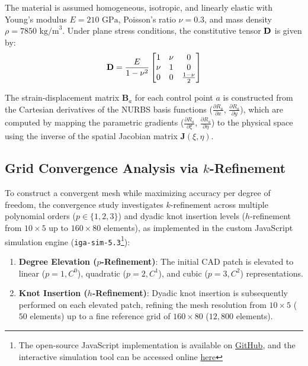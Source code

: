 The material is assumed homogeneous, isotropic, and linearly elastic with Young's modulus $E = 210\text{ GPa}$, Poisson's ratio $\nu = 0.3$, and mass density $\rho = 7850\text{ kg/m}^3$. Under plane stress conditions, the constitutive tensor $\mathbf{D}$ is given by:
\begin{equation}
    \mathbf{D} = \frac{E}{1 - \nu^2} \begin{bmatrix} 1 & \nu & 0 \\ \nu & 1 & 0 \\ 0 & 0 & \frac{1 - \nu}{2} \end{bmatrix}
\end{equation}

The strain-displacement matrix $\mathbf{B}_a$ for each control point $a$ is constructed from the Cartesian derivatives of the NURBS basis functions ($\frac{\partial R_a}{\partial x}$, $\frac{\partial R_a}{\partial y}$), which are computed by mapping the parametric gradients ($\frac{\partial R_a}{\partial \xi}$, $\frac{\partial R_a}{\partial \eta}$) to the physical space using the inverse of the spatial Jacobian matrix $\mathbf{J}(\xi, \eta)$.

\subsection{Grid Convergence Analysis via \texorpdfstring{$k$-Refinement}{k-Refinement}}
To construct a convergent mesh while maximizing accuracy per degree of freedom, the convergence study investigates $k$-refinement across multiple polynomial orders ($p \in \{1, 2, 3\}$) and dyadic knot insertion levels ($h$-refinement from $10 \times 5$ up to $160 \times 80$ elements), as implemented in the custom JavaScript simulation engine (\texttt{iga-sim-5.3}\footnote{The open-source JavaScript implementation is available on \href{https://github.com/WEHBEMUMEN/internship-cnam/tree/main/app/simulations/iga-sim-5.3}{GitHub}, and the interactive simulation tool can be accessed online \href{https://cnam-internship-mumen.netlify.app/app/simulations/iga-sim-5.3/}{here}}):
\begin{enumerate}[leftmargin=*]
    \item \textbf{Degree Elevation ($p$-Refinement)}: The initial CAD patch is elevated to linear ($p=1, C^0$), quadratic ($p=2, C^1$), and cubic ($p=3, C^2$) representations.
    \item \textbf{Knot Insertion ($h$-Refinement)}: Dyadic knot insertion is subsequently performed on each elevated patch, refining the mesh resolution from $10 \times 5$ ($50$ elements) up to a fine reference grid of $160 \times 80$ ($12,800$ elements).
\end{enumerate}

